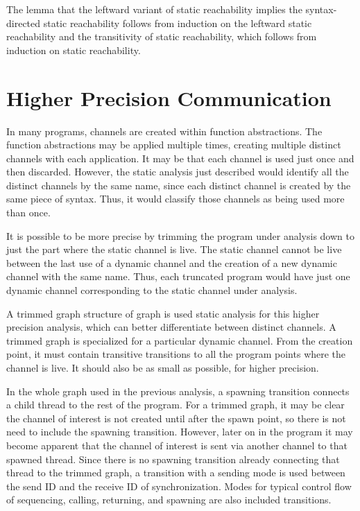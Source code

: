 \documentclass{article}
\begin{document}
The lemma that the leftward variant of static reachability implies the syntax-directed static
reachability follows from induction on the leftward static reachability and the
transitivity of static
reachability, which follows from induction on static reachability.

\section{Higher Precision Communication}
In many programs, channels are created within function abstractions.  The function abstractions
may be applied multiple times, creating multiple distinct channels with each application.
It may be that each channel is used just once and then discarded.  However, the static
analysis just described would identify all the distinct channels by the same name, since each
distinct channel is created by the same piece of syntax. Thus, it would classify those channels
as being used more than once.

It is possible to be more precise by trimming the program under analysis down to just the part
where the static channel is live. The static channel cannot be live between the last use of a
dynamic channel and the creation of a new dynamic channel with the same name.  Thus, each
truncated program would have just one dynamic channel corresponding to the static channel under
analysis. 

A trimmed graph structure of graph is used static analysis for this higher precision
analysis, which can better differentiate between distinct channels. 
A trimmed graph is specialized for a particular dynamic channel.  From the creation
point, it must contain transitive transitions to all the program points where the
channel is live. It should also be as small as possible, for higher precision.

In the whole graph used in the previous analysis, a spawning transition
connects a child thread to the rest of the program.  For a trimmed graph,
it may be clear the channel of interest is not created until after the spawn point,
so there is not need to include the spawning transition.  However, later on in the
program it may become apparent that the channel of interest is sent via another channel to
that spawned thread.  Since there is no spawning transition already connecting that
thread to the trimmed graph, a transition with a sending mode is used between the
send ID and the receive ID of synchronization. Modes for typical control flow of
sequencing, calling, returning, and spawning are also included transitions.
\end{document}
